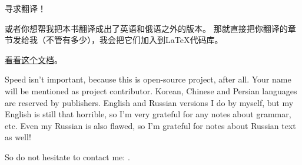 \documentclass[UTF8,nofonts]{ctexart}
\begin{document}

\vspace*{\fill}

\Huge 寻求翻译！

\normalsize

\bigskip
\bigskip
\bigskip


或者你想帮我把本书翻译成出了英语和俄语之外的版本。
那就直接把你翻译的章节发给我（不管有多少），我会把它们加入到LaTeX代码库。

\href{https://github.com/dennis714/RE-for-beginners/blob/master/Translation.md}{看看这个文档}。

Speed isn't important, because this is open-source project, after all.
Your name will be mentioned as project contributor.
Korean, Chinese and Persian languages are reserved by publishers.
English and Russian versions I do by myself, but my English is still that horrible, so I'm very grateful for any notes about grammar, etc.
Even my Russian is also flawed, so I'm grateful for notes about Russian text as well!%

So do not hesitate to contact me: \GTT{\EMAIL}.

\vspace*{\fill}
\vfill
\end{document}
